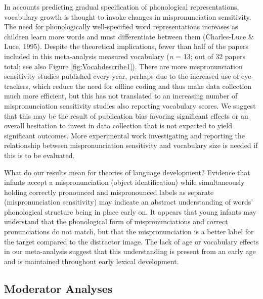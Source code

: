 \documentclass[man]{apa6}
\begin{document}
In accounts predicting gradual specification of phonological representations, vocabulary growth is thought to invoke changes in mispronunciation sensitivity. The need for phonologically well-specified word representations increases as children learn more words and must differentiate between them (Charles-Luce \& Luce, 1995). Despite the theoretical implications, fewer than half of the papers included in this meta-analysis measured vocabulary (\emph{n} = 13; out of 32 papers total; see also Figure \ref{fig:Vocabdescribe1}). There are more mispronunciation sensitivity studies published every year, perhaps due to the increased use of eye-trackers, which reduce the need for offline coding and thus make data collection much more efficient, but this has not translated to an increasing number of mispronunciation sensitivity studies also reporting vocabulary scores. We suggest that this may be the result of publication bias favoring significant effects or an overall hesitation to invest in data collection that is not expected to yield significant outcomes. More experimental work investigating and reporting the relationship between mispronunciation sensitivity and vocabulary size is needed if this is to be evaluated.

What do our results mean for theories of language development? Evidence that infants accept a mispronunciation (object identification) while simultaneously holding correctly pronounced and mispronounced labels as separate (mispronunciation sensitivity) may indicate an abstract understanding of words' phonological structure being in place early on. It appears that young infants may understand that the phonological form of mispronunciations and correct pronunciations do not match, but that the mispronunciation is a better label for the target compared to the distractor image. The lack of age or vocabulary effects in our meta-analysis suggest that this understanding is present from an early age and is maintained throughout early lexical development.

\hypertarget{moderator-analyses-1}{%
\subsection{Moderator Analyses}\label{moderator-analyses-1}}
\end{document}
